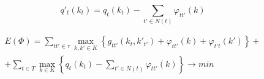 \begin{equation*}
  q'_{t} \left( k_{t} \right) = q_{t}\left( k_{t} \right)
    - \sum_{t' \in N\left( t \right)} \varphi_{tt'} \left( k \right)
\end{equation*}

\begin{equation*}
  \begin{split}
    E\left( \Phi \right) =
      \sum_{tt' \in \tau} \max\limits_{k, k' \in K}{
        \left\{g_{tt'}\left( k_{t}, k'_{t'} \right) +
        \varphi_{tt'}\left( k \right) + \varphi_{t't}\left( k' \right)
      \right\}} + \\ +
      \sum_{t \in T} \max\limits_{k \in K}{
        \left\{q_{t} \left( k_{t} \right) -
        \sum_{t' \in N\left( t \right)} \varphi_{tt'} \left( k \right)\right\}}
    \rightarrow min
  \end{split}
\end{equation*}

